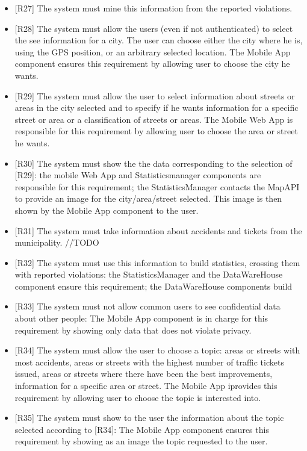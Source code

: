 \documentclass[a4paper]{report}
\begin{document}
\begin{itemize}
\item {[R27]}	\label{R27}The system must mine this information from the reported violations.
\item {[R28]}	\label{R28}The system must allow the users (even if not authenticated) to select the see information for a city. The user can choose either the city where he is, using the GPS position, or an arbitrary selected location. The Mobile App component ensures this requirement by allowing user to choose the city he wants.
\item {[R29]}	\label{R29}The system must allow the user to select information about streets or areas in the city selected and to specify if he wants information for a specific street or area or a classification of streets or areas. The Mobile Web App is responsible for this requirement by allowing user to choose the area or street he wants.
\item {[R30]}	\label{R30}The system must show the the data corresponding to the selection of [R29]: the mobile Web App and Statisticsmanager components are responsible for this requirement; the StatisticsManager contacts the MapAPI to provide an image for the city/area/street selected. This image is then shown by the Mobile App component to the user.
\item {[R31]}	\label{R31}The system must take information about accidents and tickets from the municipality. //TODO
\item {[R32]}	\label{R32}The system must use this information to build statistics, crossing them with reported violations: the StatisticsManager and the DataWareHouse component ensure this requirement; the DataWareHouse components build 
\item {[R33]}	\label{R33}The system must not allow common users to see confidential data about other people: The Mobile App component is in charge for this requirement by showing only data that does not violate privacy.
\item {[R34]}	\label{R34}The system must allow the user to choose a topic: areas or streets with most accidents, areas or streets with the highest number of traffic tickets issued, areas or streets where there have been the best improvements, information for a specific area or street. The Mobile App iprovides this requirement by allowing user to choose the topic is interested into.
\item {[R35]}	\label{R35}The system must show to the user the information about the topic selected according to [R34]: The Mobile App component ensures this requirement by showing as an image the topic requested to the user.

\end{itemize}
\end{document}
